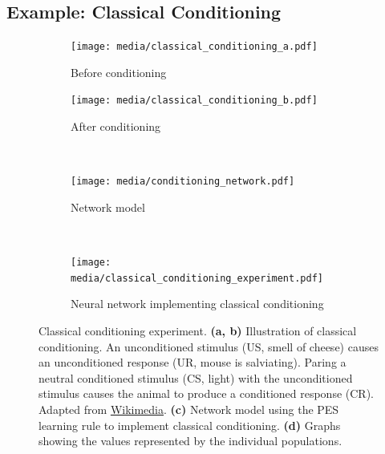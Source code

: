 \documentclass[10pt,letterpaper,oneside]{article}
\begin{document}


\subsection{Example: Classical Conditioning}

\begin{figure}[p]
	\centering%
	\begin{subfigure}{0.5\textwidth}%
		\centering%
		\texttt{[image: media/classical\_conditioning\_a.pdf]}%
		\caption{Before conditioning}%
		\label{fig:classical_conditioning_a}
	\end{subfigure}%
	\begin{subfigure}{0.5\textwidth}%
		\centering%
		\texttt{[image: media/classical\_conditioning\_b.pdf]}%
		\caption{After conditioning}%
		\label{fig:classical_conditioning_b}
	\end{subfigure}\\[0.5cm]
	\begin{subfigure}{\textwidth}%
		\centering%
		\texttt{[image: media/conditioning\_network.pdf]}%
		\caption{Network model}
		\label{fig:conditioning_network}
	\end{subfigure}\\[0.5cm]
	\begin{subfigure}{\textwidth}
		\centering
		\texttt{[image: media/classical\_conditioning\_experiment.pdf]}
		\caption{Neural network implementing classical conditioning}
		\label{fig:classical_conditioning_experiment}
	\end{subfigure}
	\caption{Classical conditioning experiment. \textbf{(a, b)} Illustration of classical conditioning. An unconditioned stimulus (US, smell of cheese) causes an unconditioned response (UR, mouse is salviating). Paring a neutral conditioned stimulus (CS, light) with the unconditioned stimulus causes the animal to produce a conditioned response (CR). Adapted from \href{https://commons.wikimedia.org/wiki/File:Classical_conditioning_-_extinction.svg}{Wikimedia}. \textbf{(c)} Network model using the PES learning rule to implement classical conditioning.  \textbf{(d)} Graphs showing the values represented by the individual populations.}
	\label{fig:classical_conditioning}
\end{figure}
\end{document}
